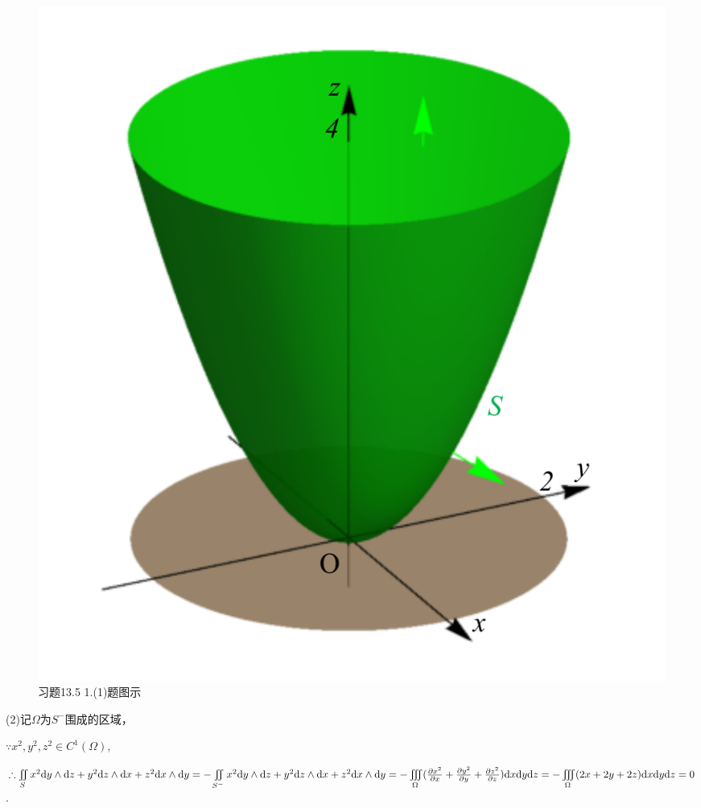 \documentclass[12pt,UTF8,fleqn]{ctexart}
\newcommand{\varIIInt}[5]{\iiint\limits_{#1}#2\mathrm d#3\mathrm d#4\mathrm d#5}
\newcommand{\md}[1]{\mathrm d#1}
\newcommand{\BSIInt}[2]{\iint\limits_{#1}#2}
\newcommand{\pp}[2]{\frac{\partial #1}{\partial #2}}
\begin{document}
\begin{enumerate}
\begin{figure}[H]
\begin{center}
\includegraphics[height=0.5\textheight]{Figures24/Fig13-5-1-1.pdf}
\end{center}
\caption{习题13.5 1.(1)题图示}
\label{13-5-1-1}
\end{figure}

(2)记$\Omega$为$S^-$围成的区域，

$\because x^2,y^2,z^2\in C^1(\Omega)$,

$\therefore\BSIInt S{x^2\md y\wedge\md z+y^2\md z\wedge\md x+z^2\md x\wedge\md y}=-\BSIInt{S^-}{x^2\md y\wedge\md z+y^2\md z\wedge\md x+z^2\md x\wedge\md y}\\
=-\varIIInt\Omega{(\pp{x^2}x+\pp{y^2}y+\pp{z^2}z)}xyz=-\varIIInt\Omega{(2x+2y+2z)}xyz=0$.


\end{enumerate}
\end{document}
